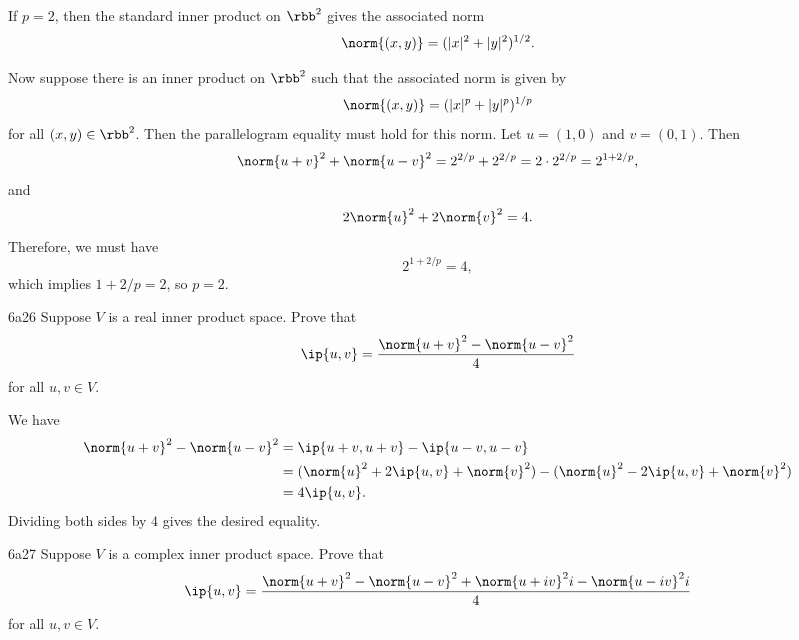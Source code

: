 \begin{sol}
    If $p = 2$, then the standard inner product on $\rbb^2$ gives the associated norm
    \[
        \norm{(x, y)} = (|x|^2 + |y|^2)^{1/2}.
    \]

    Now suppose there is an inner product on $\rbb^2$ such that the associated norm is given by
    \[
        \norm{(x, y)} = (|x|^p + |y|^p)^{1/p}
    \]
    for all $(x, y) \in \rbb^2$.
    Then the parallelogram equality must hold for this norm.
    Let $u = (1, 0)$ and $v = (0, 1)$.
    Then
    \[
        \norm{u + v}^2 + \norm{u - v}^2 = 2^{2/p} + 2^{2/p} = 2\cdot 2^{2/p} = 2^{1 + 2/p},
    \]
    and
    \[
        2\norm{u}^2 + 2\norm{v}^2 = 4.
    \]
    Therefore, we must have
    \[
        2^{1 + 2/p} = 4,
    \]
    which implies $1 + 2/p = 2$, so $p = 2$.
\end{sol}

\begin{exercise}{6a26}
    Suppose $V$ is a real inner product space.
    Prove that
    \[
        \ip{u, v} = \frac{\norm{u + v}^2 - \norm{u - v}^2}{4}
    \]
    for all $u, v \in V$.
\end{exercise}

\begin{sol}
    We have
    \begin{align*}
        \norm{u + v}^2 - \norm{u - v}^2 &= \ip{u + v, u + v} - \ip{u - v, u - v} \\
        &= (\norm{u}^2 + 2\ip{u, v} + \norm{v}^2) - (\norm{u}^2 - 2\ip{u, v} + \norm{v}^2) \\
        &= 4\ip{u, v}.
    \end{align*}
    Dividing both sides by $4$ gives the desired equality.
\end{sol}

\begin{exercise}{6a27}
    Suppose $V$ is a complex inner product space.
    Prove that
    \[
        \ip{u, v} = \frac{\norm{u + v}^2 - \norm{u - v}^2 + \norm{u + iv}^2 i - \norm{u - iv}^2 i}{4}
    \]
    for all $u, v \in V$.
\end{exercise}

